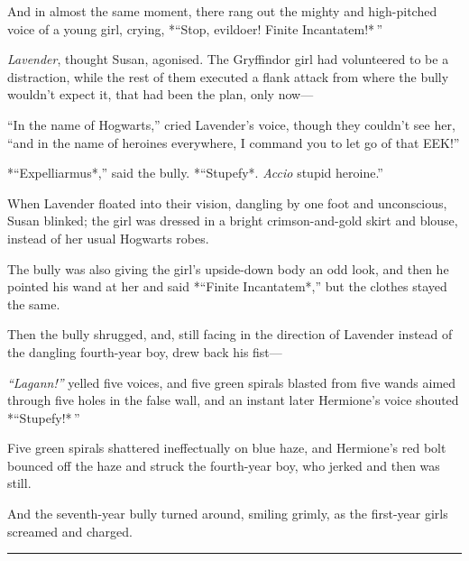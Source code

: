 And in almost the same moment, there rang out the mighty and
high-pitched voice of a young girl, crying, *``Stop, evildoer! Finite
Incantatem!* ''

\emph{Lavender}, thought Susan, agonised. The Gryffindor girl had
volunteered to be a distraction, while the rest of them executed a flank
attack from where the bully wouldn't expect it, that had been the plan,
only now---

``In the name of Hogwarts,'' cried Lavender's voice, though they
couldn't see her, ``and in the name of heroines everywhere, I command
you to let go of that EEK!''

*``Expelliarmus*,'' said the bully. *``Stupefy*. \emph{Accio} stupid
heroine.''

When Lavender floated into their vision, dangling by one foot and
unconscious, Susan blinked; the girl was dressed in a bright
crimson-and-gold skirt and blouse, instead of her usual Hogwarts robes.

The bully was also giving the girl's upside-down body an odd look, and
then he pointed his wand at her and said *``Finite Incantatem*,'' but
the clothes stayed the same.

Then the bully shrugged, and, still facing in the direction of Lavender
instead of the dangling fourth-year boy, drew back his fist---

\emph{``Lagann!''} yelled five voices, and five green spirals blasted
from five wands aimed through five holes in the false wall, and an
instant later Hermione's voice shouted *``Stupefy!* ''

Five green spirals shattered ineffectually on blue haze, and Hermione's
red bolt bounced off the haze and struck the fourth-year boy, who jerked
and then was still.

And the seventh-year bully turned around, smiling grimly, as the
first-year girls screamed and charged.

\begin{center}\rule{3in}{0.4pt}\end{center}

